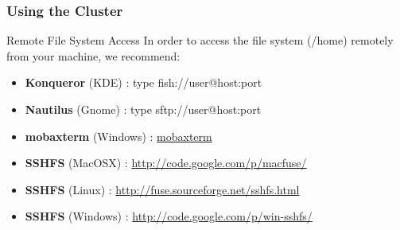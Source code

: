 \documentclass{beamer}
\begin{document}
\begin{frame}[fragile]
  \frametitle{Using the Cluster}
      \begin{block}{Remote File System Access}
       In order to access the file system (/home) remotely from your machine, we recommend:
        \begin{itemize}
        \item \textbf{Konqueror} (KDE) : type fish://user@host:port
        \item \textbf{Nautilus} (Gnome) : type sftp://user@host:port
        \item \textbf{mobaxterm} (Windows) : \href{http://mobaxterm.mobatek.net/}{mobaxterm}
        \item \textbf{SSHFS} (MacOSX) : \url{http://code.google.com/p/macfuse/}
        \item \textbf{SSHFS} (Linux) : \url{http://fuse.sourceforge.net/sshfs.html}
        \item \textbf{SSHFS} (Windows) : \url{http://code.google.com/p/win-sshfs/}
      \end{itemize}
      \end{block}
\end{frame}

\end{document}
